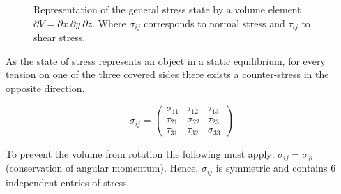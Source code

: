 \documentclass[pdftex,a4paper,parskip,listof=totoc,bibliography=totoc,onehalfspacing,12pt]{scrreprt}
\begin{document}
\begin{figure}
\caption[Representation of the general stress state by a volume element.]{Representation of the general stress state by a volume element $\partial V = \partial x~ \partial y~ \partial z$. Where $\sigma_{ij}$ corresponds to normal stress and $\tau_{ij}$ to shear stress. }
\label{fig:AllgSpZu}
\end{figure}

As the state of stress represents an object in a static equilibrium, for every tension on one of the three covered sides there exists a counter-stress in the opposite direction. 

\begin{minipage}[t]{0.4\textwidth}
\begin{equation}
	\sigma_{ij}=\left(
\begin{array}{ccc}
\sigma_{11} & \tau_{12} & \tau_{13}\\
\tau_{21} & \sigma_{22} & \tau_{23}\\
\tau_{31} & \tau_{32} & \sigma_{33}
\end{array}
\right)
\end{equation}
\end{minipage}
\hfill
\begin{minipage}[t]{0.45\textwidth}
To prevent the volume from rotation the following must apply: $\sigma_{ij} = \sigma_{ji}$ (conservation of angular momentum). Hence, $\sigma_{ij}$ is symmetric and contains \num{6} independent entries of stress.
\end{minipage}
\end{document}
